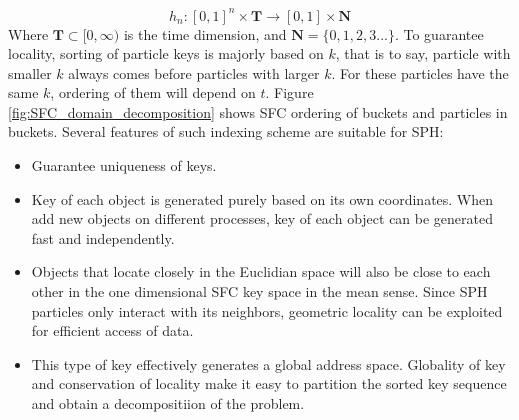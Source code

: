 \documentclass[procedia]{easychair}
\begin{document}
\begin{equation}
h_n: [0,1]^n \times \textbf{T} \rightarrow [0,1] \times \textbf{N}
\end{equation}
Where $\textbf{T} \subset [0,\infty)$ is the time dimension, and $\textbf{N}=\lbrace 0, 1, 2, 3...\rbrace$.
To guarantee locality, sorting of particle keys is majorly based on $k$, that is to say, particle with smaller $k$ always comes before particles with larger $k$. For these particles have the same $k$, ordering of them will depend on $t$. Figure \ref{fig:SFC_domain_decomposition} shows SFC ordering of buckets and particles in buckets. 
Several features of such indexing scheme are suitable for SPH:
\begin{itemize}
\item Guarantee uniqueness of keys.
\item Key of each object is generated purely based on its own coordinates. When add new objects on different processes, key of each object can be generated fast and independently.
\item Objects that locate closely in the Euclidian space will also be close to each other in the one dimensional SFC key space in the mean sense. Since SPH particles only interact with its neighbors, geometric locality can be exploited for efficient access of data.
\item This type of key effectively generates a global address space. Globality of key and conservation of locality make it easy to partition the sorted key sequence and obtain a decompositiion of the problem.
\end{itemize}
\end{document}
